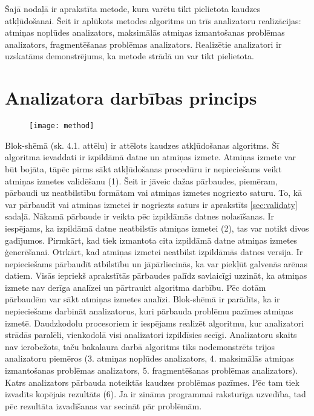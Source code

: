 ﻿Šajā nodaļā ir aprakstīta metode, kura varētu tikt pielietota kaudzes atkļūdošanai. 
Šeit ir aplūkots metodes algoritms un trīs analizatoru realizācijas: atmiņas noplūdes analizators, maksimālās atmiņas izmantošanas problēmas analizators, fragmentēšanas problēmas analizators.
Realizētie analizatori ir uzskatāms demonstrējums, ka metode strādā un var tikt pielietota.
\section{Analizatora darbības princips}

 \begin{figure}[h]
\begin{center}
\texttt{[image: method]}
\end{center}
\caption{\textbf{\fontsize{11}{12}\selectfont {Uz metodi balstītā algoritma blok-shēma}}}
\end{figure}

Blok-shēmā (sk. 4.1. attēlu) ir attēlots kaudzes atkļūdošanas algoritms.
Šī algoritma ievaddati ir izpildāmā datne un atmiņas izmete.
Atmiņas izmete var būt bojāta, tāpēc pirms sākt atkļūdošanas procedūru ir nepieciešams veikt atmiņas izmetes validēšanu (1).
Šeit ir jāveic dažas pārbaudes, piemēram, pārbaudi uz neatbilstību formātam vai atmiņas izmetes nogriezto saturu.
To, kā var pārbaudīt vai atmiņas izmetei ir nogriezts saturs ir aprakstīts \ref{sec:validaty} sadaļā.
Nākamā pārbaude ir veikta pēc izpildāmās datnes nolasīšanas.
Ir iespējams, ka izpildāmā datne neatbilstīs atmiņas izmetei (2), tas var notikt divos gadījumos.
Pirmkārt, kad tiek izmantota cita izpildāmā datne atmiņas izmetes ģenerēšanai.
Otrkārt, kad atmiņas izmetei neatbilst izpildāmās datnes versija.
Ir nepieciešams pārbaudīt atbilstību un jāpārliecinās, ka var piekļūt galvenās arēnas datiem.
Visās iepriekš aprakstītās pārbaudes palīdz savlaicīgi uzzināt, ka atmiņas izmete nav derīga analīzei un pārtraukt algoritma darbību.
Pēc dotām pārbaudēm var sākt atmiņas izmetes analīzi.
Blok-shēmā ir parādīts, ka ir nepieciešams darbināt analizatorus, kuri  pārbauda problēmu pazīmes atmiņas izmetē.
Daudzkodolu procesoriem ir iespējams realizēt algoritmu, kur analizatori strādās paralēli, vienkodolā visi analizatori izpildīsies secīgi.
Analizatoru skaits nav ierobežots, taču bakalaura darbā algoritms tiks nodemonstrēts trijos analizatoru piemēros (3. atmiņas noplūdes analizators, 4. maksimālās atmiņas izmantošanas problēmas analizators, 5. fragmentēšanas problēmas analizators).
Katrs analizators pārbauda noteiktās kaudzes problēmas pazīmes.
Pēc tam tiek izvadīts kopējais rezultāts (6).
Ja ir zināma programmai raksturīga uzvedība, tad pēc rezultāta izvadīšanas var secināt pār problēmām.

